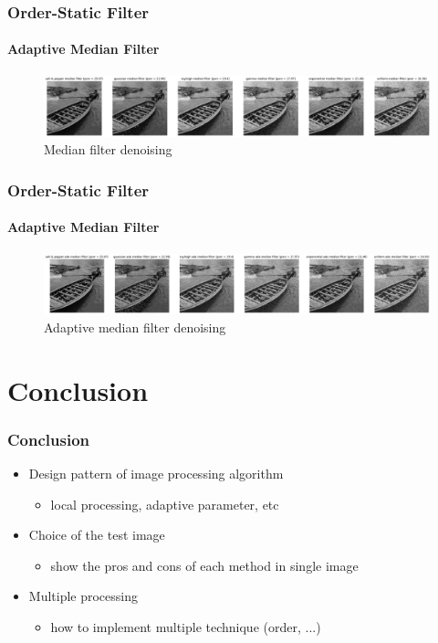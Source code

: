 \documentclass[
	11pt, %
	aspectratio=169, %
]{beamer}
\begin{document}
		\begin{frame}
			\frametitle{Order-Static Filter}
			\framesubtitle{Adaptive Median Filter}

			\begin{figure}[H]
				\includegraphics[width = \linewidth]{ada_median_1.png}
				\caption{Median filter denoising}
				\label{fig:ada_median_1}
			\end{figure}
		\end{frame}

		\begin{frame}
			\frametitle{Order-Static Filter}
			\framesubtitle{Adaptive Median Filter}

			\begin{figure}[H]
				\includegraphics[width = \linewidth]{ada_median_2.png}
				\caption{Adaptive median filter denoising}
				\label{fig:ada_median_2}
			\end{figure}
		\end{frame}

\section{Conclusion}

	\begin{frame}
		\frametitle{Conclusion}

		\begin{itemize}
			\item Design pattern of image processing algorithm
			\begin{itemize}
				\item local processing, adaptive parameter, etc
			\end{itemize}
			\item Choice of the test image
			\begin{itemize}
				\item show the pros and cons of each method in single image
			\end{itemize}
			\item Multiple processing
			\begin{itemize}
				\item how to implement multiple technique (order, ...)
			\end{itemize}
		\end{itemize}
	\end{frame}
		
\end{document}
